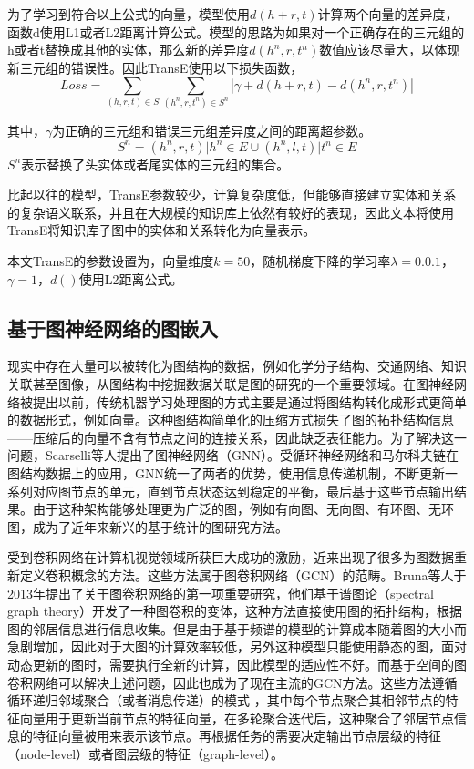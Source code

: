 为了学习到符合以上公式的向量，模型使用$d(h+r, t)$计算两个向量的差异度，函数d使用L1或者L2距离计算公式。模型的思路为如果对一个正确存在的三元组的h或者t替换成其他的实体，那么新的差异度$d(h^n,r,t^n)$数值应该尽量大，以体现新三元组的错误性。因此TransE使用以下损失函数，
\begin{equation}
Loss = \sum_{(h,r,t) \in S}\sum_{(h^n,r,t^n)\in S^n}|\gamma+d(h+r, t)-d(h^n,r,t^n)|
\end{equation}

其中，$\gamma$为正确的三元组和错误三元组差异度之间的距离超参数。
\begin{equation}
S^n = {(h^n,r,t)|h^n \in E} \cup {(h^n,l,t)|t^n \in E}
\end{equation}
$S^n$表示替换了头实体或者尾实体的三元组的集合。

比起以往的模型，TransE参数较少，计算复杂度低，但能够直接建立实体和关系的复杂语义联系，并且在大规模的知识库上依然有较好的表现，因此文本将使用TransE将知识库子图中的实体和关系转化为向量表示。

本文TransE的参数设置为，向量维度$k=50$，随机梯度下降的学习率$\lambda=0.0.1$，$\gamma=1$，$d()$使用L2距离公式。

\subsection{基于图神经网络的图嵌入}
现实中存在大量可以被转化为图结构的数据，例如化学分子结构、交通网络、知识关联甚至图像，从图结构中挖掘数据关联是图的研究的一个重要领域。在图神经网络被提出以前，传统机器学习处理图的方式主要是通过将图结构转化成形式更简单的数据形式，例如向量。这种图结构简单化的压缩方式损失了图的拓扑结构信息——压缩后的向量不含有节点之间的连接关系，因此缺乏表征能力。为了解决这一问题，Scarselli等人提出了图神经网络（GNN）。受循环神经网络和马尔科夫链在图结构数据上的应用，GNN统一了两者的优势，使用信息传递机制，不断更新一系列对应图节点的单元，直到节点状态达到稳定的平衡，最后基于这些节点输出结果。由于这种架构能够处理更为广泛的图，例如有向图、无向图、有环图、无环图，成为了近年来新兴的基于统计的图研究方法。

受到卷积网络在计算机视觉领域所获巨大成功的激励，近来出现了很多为图数据重新定义卷积概念的方法。这些方法属于图卷积网络（GCN）的范畴。Bruna等人于2013年提出了关于图卷积网络的第一项重要研究，他们基于谱图论（spectral graph theory）开发了一种图卷积的变体，这种方法直接使用图的拓扑结构，根据图的邻居信息进行信息收集。但是由于基于频谱的模型的计算成本随着图的大小而急剧增加，因此对于大图的计算效率较低，另外这种模型只能使用静态的图，面对动态更新的图时，需要执行全新的计算，因此模型的适应性不好。而基于空间的图卷积网络可以解决上述问题，因此也成为了现在主流的GCN方法。这些方法遵循循环递归邻域聚合（或者消息传递）的模式
，其中每个节点聚合其相邻节点的特征向量用于更新当前节点的特征向量，在多轮聚合迭代后，这种聚合了邻居节点信息的特征向量被用来表示该节点。再根据任务的需要决定输出节点层级的特征（node-level）或者图层级的特征（graph-level）。

